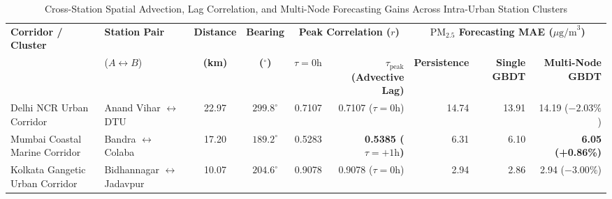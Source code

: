 \begin{table}[t]
\caption{Cross-Station Spatial Advection, Lag Correlation, and Multi-Node Forecasting Gains Across Intra-Urban Station Clusters}
\label{tab:spatial_advection}
\centering
\small
\begin{tabular}{llccrrrrr}
\toprule
\textbf{Corridor / Cluster} & \textbf{Station Pair} & \textbf{Distance} & \textbf{Bearing} & \multicolumn{2}{c}{\textbf{Peak Correlation ($r$)}} & \multicolumn{3}{c}{\textbf{$\text{PM}_{2.5}$ Forecasting MAE ($\mu\text{g/m}^3$)}} \\
\cmidrule(lr){5-6} \cmidrule(lr){7-9}
& ($A \leftrightarrow B$) & \textbf{(km)} & \textbf{($^\circ$)} & \textbf{$\tau = 0\text{h}$} & \textbf{$\tau_{\text{peak}}$ (Advective Lag)} & \textbf{Persistence} & \textbf{Single GBDT} & \textbf{Multi-Node GBDT} \\
\midrule
Delhi NCR Urban Corridor & Anand Vihar $\leftrightarrow$ DTU & 22.97 & $299.8^\circ$ & 0.7107 & 0.7107 ($\tau = 0\text{h}$) & 14.74 & 13.91 & 14.19 ($-2.03\%$) \\
Mumbai Coastal Marine Corridor & Bandra $\leftrightarrow$ Colaba & 17.20 & $189.2^\circ$ & 0.5283 & \textbf{0.5385 ($\tau = +1\text{h}$)} & 6.31 & 6.10 & \textbf{6.05 (+0.86\%)} \\
Kolkata Gangetic Urban Corridor & Bidhannagar $\leftrightarrow$ Jadavpur & 10.07 & $204.6^\circ$ & 0.9078 & 0.9078 ($\tau = 0\text{h}$) & 2.94 & 2.86 & 2.94 ($-3.00\%$) \\
\bottomrule
\end{tabular}
\end{table}
